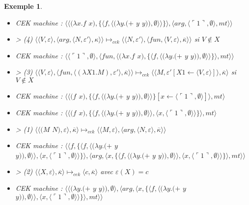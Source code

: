 \documentclass[10pt,a4paper]{report}
\newtheorem{ex}{Exemple}
\begin{document}
\begin{ex}
\begin{itemize}
			\item[] CEK machine : $\langle\langle(\lambda x.f$ $x),\{\langle f,\langle(\lambda y.(+$ $y$ $y)),\emptyset\rangle\rangle\}\rangle,\langle arg,\langle\ulcorner 1\urcorner,\emptyset\rangle,mt\rangle\rangle$
			\item[] > (4) $\langle \langle V,\varepsilon\rangle,\langle arg,\langle N,\varepsilon'\rangle,\kappa\rangle\rangle \longmapsto_{cek} \langle \langle N,\varepsilon'\rangle,\langle fun,\langle V,\varepsilon\rangle,\overline{\kappa}\rangle\rangle$ si $V \notin X$
			\item[] CEK machine : $\langle\langle\ulcorner 1\urcorner,\emptyset\rangle,\langle fun,\langle(\lambda x.f$ $x),\{\langle f,\langle(\lambda y.(+$ $y$ $y)),\emptyset\rangle\rangle\}\rangle,mt\rangle\rangle$
			\item[] > (3) $\langle\langle V,\varepsilon\rangle,\langle fun,\langle (\lambda X1.M),\varepsilon'\rangle,\overline{\kappa} \rangle \rangle \longmapsto_{cek} \langle \langle M,\varepsilon'[X1 \leftarrow \langle V,\varepsilon\rangle]\rangle,\overline{\kappa}\rangle$ si $V \notin X$
			\item[] CEK machine : $\langle\langle(f$ $x),\{\langle f,\langle(\lambda y.(+$ $y$ $y)),\emptyset\rangle\rangle\}[x \leftarrow \langle\ulcorner 1\urcorner,\emptyset\rangle]\rangle,mt\rangle$
			\item[] CEK machine : $\langle\langle(f$ $x),\{\langle f,\langle(\lambda y.(+$ $y$ $y)),\emptyset\rangle\rangle,\langle x,\langle\ulcorner 1\urcorner,\emptyset\rangle\rangle\}\rangle,mt\rangle$
			\item[] > (1) $\langle\langle(M$ $N),\varepsilon\rangle,\overline{\kappa}\rangle \longmapsto_{cek} \langle \langle M,\varepsilon\rangle,\langle arg,\langle N,\varepsilon\rangle,\overline{\kappa}\rangle\rangle$
			\item[] CEK machine : $\langle\langle f,\{\langle f,\langle(\lambda y.(+$ $y$ $y)),\emptyset\rangle\rangle,\langle x,\langle\ulcorner 1\urcorner,\emptyset\rangle\rangle\}\rangle,\langle arg,\langle x,\{\langle f,\langle(\lambda y.(+$ $y$ $y)),\emptyset\rangle\rangle,\langle x,\langle\ulcorner 1\urcorner,\emptyset\rangle\rangle\}\rangle,mt\rangle\rangle$
			\item[] > (2) $\langle\langle X,\varepsilon\rangle,\overline{\kappa}\rangle \longmapsto_{cek} \langle c,\overline{\kappa}\rangle$ avec $\varepsilon(X) = c$
			\item[] CEK machine : $\langle\langle(\lambda y.(+$ $y$ $y)),\emptyset\rangle,\langle arg,\langle x,\{\langle f,\langle(\lambda y.(+$ $y$ $y)),\emptyset\rangle\rangle,\langle x,\langle\ulcorner 1\urcorner,\emptyset\rangle\rangle\}\rangle,mt\rangle\rangle$

\end{itemize}
\end{ex}
\end{document}
